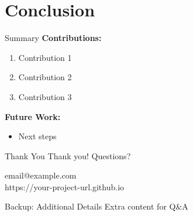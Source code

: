 \documentclass[aspectratio=169]{beamer}
\begin{document}
\section{Conclusion}

\begin{frame}{Summary}
    \textbf{Contributions:}
    \begin{enumerate}
        \item {{Contribution 1}}
        \item {{Contribution 2}}
        \item {{Contribution 3}}
    \end{enumerate}

    \vspace{1em}
    \textbf{Future Work:}
    \begin{itemize}
        \item {{Next steps}}
    \end{itemize}
\end{frame}

\begin{frame}{Thank You}
    \centering
    \Large Thank you! Questions?

    \vspace{1.5em}
    \normalsize
    {{email@example.com}} \\
    {{https://your-project-url.github.io}}
\end{frame}

\appendix

\begin{frame}{Backup: Additional Details}
    {{Extra content for Q\&A}}
\end{frame}
\end{document}

